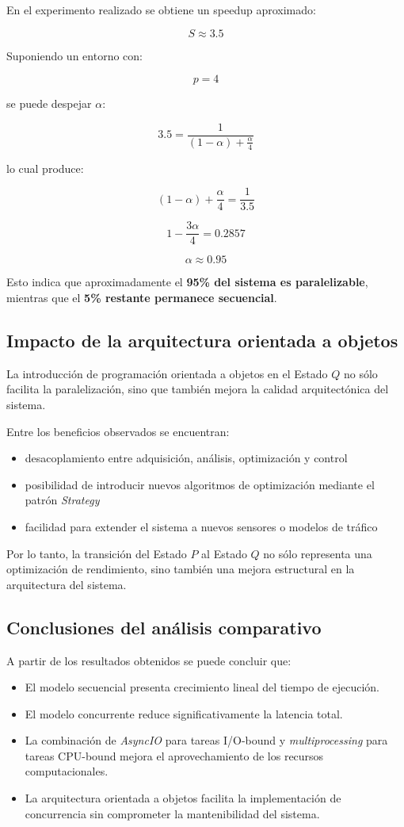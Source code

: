 \documentclass[12pt]{article}
\begin{document}
En el experimento realizado se obtiene un speedup aproximado:

\[
S \approx 3.5
\]

Suponiendo un entorno con:

\[
p = 4
\]

se puede despejar \(\alpha\):

\[
3.5 = \frac{1}{(1-\alpha) + \frac{\alpha}{4}}
\]

lo cual produce:

\[
(1-\alpha) + \frac{\alpha}{4} = \frac{1}{3.5}
\]

\[
1 - \frac{3\alpha}{4} = 0.2857
\]

\[
\alpha \approx 0.95
\]

Esto indica que aproximadamente el \textbf{95\% del sistema es paralelizable},
mientras que el \textbf{5\% restante permanece secuencial}.

\subsection{Impacto de la arquitectura orientada a objetos}

La introducción de programación orientada a objetos en el Estado \(Q\)
no sólo facilita la paralelización, sino que también mejora la calidad
arquitectónica del sistema.

Entre los beneficios observados se encuentran:

\begin{itemize}
\item desacoplamiento entre adquisición, análisis, optimización y control
\item posibilidad de introducir nuevos algoritmos de optimización mediante
el patrón \textit{Strategy}
\item facilidad para extender el sistema a nuevos sensores o modelos de tráfico
\end{itemize}

Por lo tanto, la transición del Estado \(P\) al Estado \(Q\) no sólo
representa una optimización de rendimiento, sino también una mejora
estructural en la arquitectura del sistema.

\subsection{Conclusiones del análisis comparativo}

A partir de los resultados obtenidos se puede concluir que:

\begin{itemize}
\item El modelo secuencial presenta crecimiento lineal del tiempo de ejecución.
\item El modelo concurrente reduce significativamente la latencia total.
\item La combinación de \textit{AsyncIO} para tareas I/O-bound y
\textit{multiprocessing} para tareas CPU-bound mejora el aprovechamiento
de los recursos computacionales.
\item La arquitectura orientada a objetos facilita la implementación
de concurrencia sin comprometer la mantenibilidad del sistema.
\end{itemize}
\end{document}
